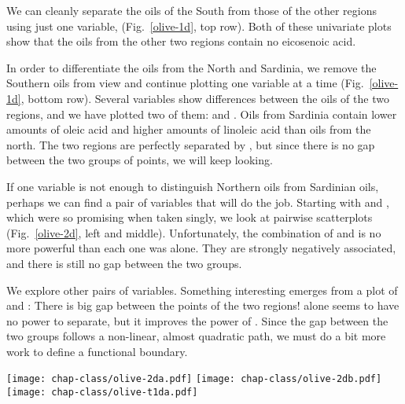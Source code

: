 We can cleanly separate the oils of the South from those of the other
regions using just one variable, 
(Fig.~\ref{olive-1d}, top row).  Both of these univariate plots show
that the oils from the other two regions contain no eicosenoic acid.

In order to differentiate the oils from the North and Sardinia, we
remove the Southern oils from view and continue plotting one variable
at a time (Fig.~\ref{olive-1d}, bottom row).  Several
variables show differences between the oils of the two regions,
and we have plotted two of them:  and .  Oils
from Sardinia contain lower amounts of oleic acid and higher amounts
of linoleic acid than oils from the north.  The two regions are
perfectly separated by , but since there is no gap
between the two groups of points, we will keep looking.

\bigskip
{} If one variable is not enough to
distinguish Northern oils from Sardinian oils, perhaps we can find a
pair of variables that will do the job.  Starting with  and
, which were so promising when taken singly, we look at
pairwise scatterplots (Fig.~\ref{olive-2d}, left and middle).
Unfortunately, the combination of  and  is no
more powerful than each one was alone.  They are strongly negatively
associated, and there is still no gap between the two groups.

We explore other pairs of variables.  Something interesting emerges
from a plot of  and : There is big gap
between the points of the two regions!   alone seems to
have no power to separate, but it improves the power of
.  Since the gap between the two groups follows a
non-linear, almost quadratic path, we must do a bit more work to
define a functional boundary.

\begin{figure*}[htbp]
\centerline{
 {\texttt{[image: chap-class/olive-2da.pdf]}}
 {\texttt{[image: chap-class/olive-2db.pdf]}}
 {\texttt{[image: chap-class/olive-t1da.pdf]}}}
\caption[Separation between the Northern and Sardinian
oils]{Separation between the Northern (purple circles) and Sardinian
(green squares) oils.  Two bivariate scatterplots {\bf (left)} and a
linear combination of  and  viewed in a
1D tour {\bf (right)}.}
\label{olive-2d}
\end{figure*}

